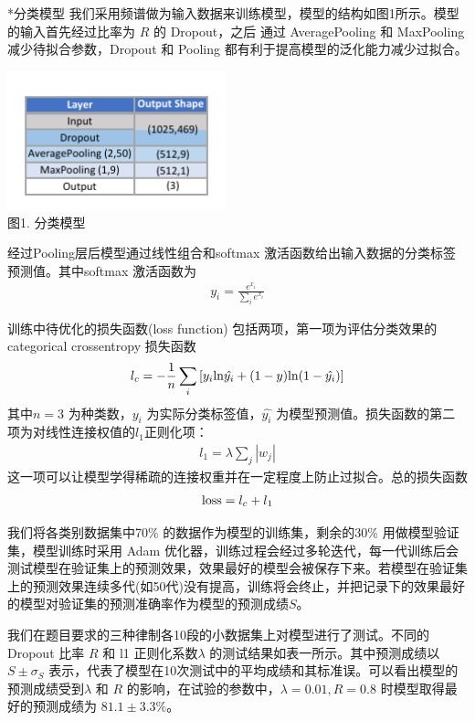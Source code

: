 \documentclass[12pt,UTF8]{ctexart}
\makeatletter
\renewcommand{\section}{\@startsection{section}{1}{0mm}
	{-\baselineskip}{0.5\baselineskip}{\bf\leftline}}
\makeatother
\begin{document}
\section*{\large 分类模型}
我们采用频谱做为输入数据来训练模型，模型的结构如图1所示。模型的输入首先经过比率为 $R$ 的 Dropout，之后 通过 AveragePooling 和 MaxPooling 减少待拟合参数，Dropout 和 Pooling 都有利于提高模型的泛化能力减少过拟合。
\begin{center}
 	\includegraphics*[height=4cm]{p1} \\ 图1. 分类模型
\end{center}
经过Pooling层后模型通过线性组合和softmax 激活函数给出输入数据的分类标签预测值。其中softmax 激活函数为
\begin{align}
y_i = \frac{e^{x_i}}{\sum_{i}e^{x_i}}
\end{align}
\par 训练中待优化的损失函数(loss function) 包括两项，第一项为评估分类效果的categorical crossentropy 损失函数 
\begin{align}
l_c = -\frac{1}{n}\sum_{i} \left[ y_i {\rm ln} \hat{y_i} + (1-y) {\rm ln}(1-\hat{y_i}) \right]
\end{align}
其中$n = 3$ 为种类数，$y_i$ 为实际分类标签值，$\hat{y_i}$ 为模型预测值。损失函数的第二项为对线性连接权值的$l_1$正则化项：
\begin{align}
l_1 = \lambda \sum_{j} |w_j|
\end{align}
这一项可以让模型学得稀疏的连接权重并在一定程度上防止过拟合。总的损失函数
\begin{align}
{\rm loss} = l_c + l_1
\end{align}
\par 我们将各类别数据集中70\% 的数据作为模型的训练集，剩余的30\% 用做模型验证集，模型训练时采用 Adam 优化器，训练过程会经过多轮迭代，每一代训练后会测试模型在验证集上的预测效果，效果最好的模型会被保存下来。若模型在验证集上的预测效果连续多代(如50代)没有提高，训练将会终止，并把记录下的效果最好的模型对验证集的预测准确率作为模型的预测成绩$S$。
\par 我们在题目要求的三种律制各10段的小数据集上对模型进行了测试。不同的Dropout 比率 $R$ 和 l1 正则化系数$\lambda$ 的测试结果如表一所示。其中预测成绩以 $S \pm \sigma_S$ 表示，代表了模型在10次测试中的平均成绩和其标准误。可以看出模型的预测成绩受到$\lambda$ 和 $R$ 的影响，在试验的参数中，$\lambda =0.01 ,R = 0.8$ 时模型取得最好的预测成绩为 $81.1 \pm 3.3 \%$。 
\end{document}
